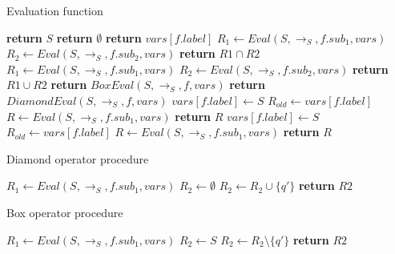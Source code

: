 \documentclass[10pt,a4paper]{article}
\begin{document}
\begin{algorithm}[H]
\caption{Evaluation function}\label{alg:eval-proc}
\begin{algorithmic}[1]
        	\State \textbf{return} $S$ 
			\State \textbf{return} $\emptyset$ 
			\State \textbf{return} $vars[f.label]$ 
        	\State $R_1 \gets Eval(S,\to_S,f.sub_1,vars)$ 
        	\State $R_2 \gets Eval(S,\to_S,f.sub_2,vars)$ 
			\State \textbf{return} $R1 \cap R2$ 
        	\State $R_1 \gets Eval(S,\to_S,f.sub_1,vars)$ 
        	\State $R_2 \gets Eval(S,\to_S,f.sub_2,vars)$ 
			\State \textbf{return} $R1 \cup R2$ 
			\State \textbf{return} $BoxEval(S,\to_S,f,vars)$ 
			\State \textbf{return} $DiamondEval(S,\to_S,f,vars)$ 
			\State $vars[f.label] \gets S$	
			\Repeat
				\State $R_{old} \gets vars[f.label]$
				\State $R \gets Eval(S,\to_S,f.sub_1,vars)$
			\State \textbf{return} $R$ 	
			\State $vars[f.label] \gets S$	
			\Repeat
				\State $R_{old} \gets vars[f.label]$
				\State $R \gets Eval(S,\to_S,f.sub_1,vars)$
			\State \textbf{return} $R$ 		
        \EndIf
	\EndProcedure
\end{algorithmic}
\end{algorithm}

\begin{algorithm}[H]
\caption{Diamond operator procedure}\label{alg:diamond-proc}
\begin{algorithmic}[1]
        	\State $R_1 \gets Eval(S,\to_S,f.sub_1,vars)$ 
        	\State $R_2 \gets \emptyset$ 
                	\State $R_2 \gets R_2 \cup \{q \prime\}$
                \EndIf
    		\EndFor
			\State \textbf{return} $ R2$ 
	\EndProcedure
\end{algorithmic}
\end{algorithm}

\begin{algorithm}[H]
\caption{Box operator procedure}\label{alg:box-proc}
\begin{algorithmic}[1]
        	\State $R_1 \gets Eval(S,\to_S,f.sub_1,vars)$ 
        	\State $R_2 \gets S$ 
                	\State $R_2 \gets R_2 \setminus \{q \prime\}$
                \EndIf
    		\EndFor
			\State \textbf{return} $ R2$ 
	\EndProcedure
\end{algorithmic}
\end{algorithm}
\end{document}
